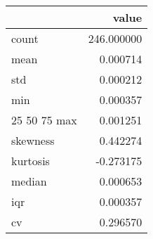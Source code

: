 \begin{tabular}{lr}
\toprule
 & value \\
\midrule
count & 246.000000 \\
mean & 0.000714 \\
std & 0.000212 \\
min & 0.000357 \\
25%
50%
75%
max & 0.001251 \\
skewness & 0.442274 \\
kurtosis & -0.273175 \\
median & 0.000653 \\
iqr & 0.000357 \\
cv & 0.296570 \\
\bottomrule
\end{tabular}
